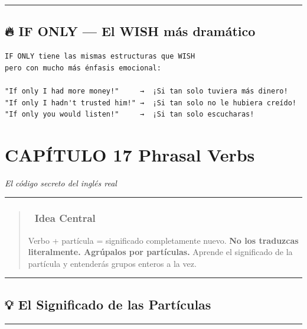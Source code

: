 \documentclass[
  spanish,
  letterpaper,
]{scrbook}
\begin{document}
\begin{center}\rule{0.5\linewidth}{0.5pt}\end{center}

\section{🔥 IF ONLY --- El WISH más
dramático}\label{if-only-el-wish-muxe1s-dramuxe1tico}

\begin{verbatim}
IF ONLY tiene las mismas estructuras que WISH
pero con mucho más énfasis emocional:

"If only I had more money!"     →  ¡Si tan solo tuviera más dinero!
"If only I hadn't trusted him!" →  ¡Si tan solo no le hubiera creído!
"If only you would listen!"     →  ¡Si tan solo escucharas!
\end{verbatim}

\chapter{CAPÍTULO 17 Phrasal Verbs}\label{capuxedtulo-17-phrasal-verbs}

\emph{El código secreto del inglés real}

\begin{center}\rule{0.5\linewidth}{0.5pt}\end{center}

\begin{quote}
\subsection{🎯 Idea Central}\label{idea-central-15}

Verbo + partícula = significado completamente nuevo. \textbf{No los
traduzcas literalmente. Agrúpalos por partículas.} Aprende el
significado de la partícula y entenderás grupos enteros a la vez.
\end{quote}

\begin{center}\rule{0.5\linewidth}{0.5pt}\end{center}

\section{💡 El Significado de las
Partículas}\label{el-significado-de-las-partuxedculas}

\begin{center}\rule{0.5\linewidth}{0.5pt}\end{center}
\end{document}
